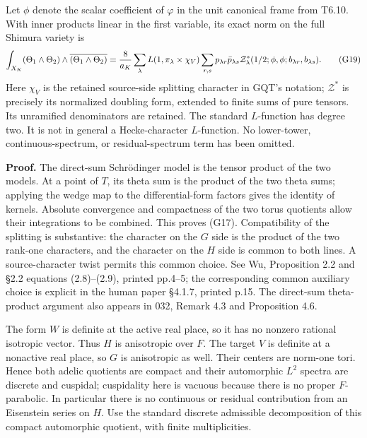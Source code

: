 Let \(\phi\) denote the scalar coefficient of \(\varphi\) in the unit canonical frame from T6.10. With inner products linear in the first variable, its exact norm on the full Shimura variety is \[
\int_{X_K}(\Theta_1\wedge\Theta_2)\wedge
                 \overline{(\Theta_1\wedge\Theta_2)}
={8\over a_K}\sum_\lambda L(1,\pi_\lambda\times\chi_V)
\sum_{r,s}p_{\lambda r}\bar p_{\lambda s}
\mathcal Z^*_{\lambda}(1/2;\phi,\phi;b_{\lambda r},b_{\lambda s}).
\tag{G19}
\] Here \(\chi_V\) is the retained source-side splitting character in GQT's notation; \(\mathcal Z^*\) is precisely its normalized doubling form, extended to finite sums of pure tensors. Its unramified denominators are retained. The standard \(L\)-function has degree two. It is not in general a Hecke-character \(L\)-function. No lower-tower, continuous-spectrum, or residual-spectrum term has been omitted.

\textbf{Proof.} The direct-sum Schrödinger model is the tensor product of the two models. At a point of \(T\), its theta sum is the product of the two theta sums; applying the wedge map to the differential-form factors gives the identity of kernels. Absolute convergence and compactness of the two torus quotients allow their integrations to be combined. This proves (G17). Compatibility of the splitting is substantive: the character on the \(G\) side is the product of the two rank-one characters, and the character on the \(H\) side is common to both lines. A source-character twist permits this common choice. See Wu, Proposition 2.2 and §2.2 equations (2.8)--(2.9), printed pp.4--5; the corresponding common auxiliary choice is explicit in the human paper §4.1.7, printed p.15. The direct-sum theta-product argument also appears in 032, Remark 4.3 and Proposition 4.6.

The form \(W\) is definite at the active real place, so it has no nonzero rational isotropic vector. Thus \(H\) is anisotropic over \(F\). The target \(V\) is definite at a nonactive real place, so \(G\) is anisotropic as well. Their centers are norm-one tori. Hence both adelic quotients are compact and their automorphic \(L^2\) spectra are discrete and cuspidal; cuspidality here is vacuous because there is no proper \(F\)-parabolic. In particular there is no continuous or residual contribution from an Eisenstein series on \(H\). Use the standard discrete admissible decomposition of this compact automorphic quotient, with finite multiplicities.

